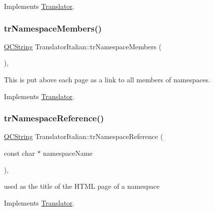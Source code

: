 Implements \mbox{\hyperlink{class_translator}{Translator}}.

\mbox{\label{class_translator_italian_ad97c677662c4d82af62a056c74c02438}} 
\subsubsection{\texorpdfstring{trNamespaceMembers()}{trNamespaceMembers()}}
{\footnotesize\ttfamily \mbox{\hyperlink{class_q_c_string}{Q\+C\+String}} Translator\+Italian\+::tr\+Namespace\+Members (\begin{DoxyParamCaption}{ }\end{DoxyParamCaption})\hspace{0.3cm}{\ttfamily [inline]}, {\ttfamily [virtual]}}

This is put above each page as a link to all members of namespaces. 

Implements \mbox{\hyperlink{class_translator}{Translator}}.

\mbox{\label{class_translator_italian_a5d22c0f0c87bf72f003f810a5e528957}} 
\subsubsection{\texorpdfstring{trNamespaceReference()}{trNamespaceReference()}}
{\footnotesize\ttfamily \mbox{\hyperlink{class_q_c_string}{Q\+C\+String}} Translator\+Italian\+::tr\+Namespace\+Reference (\begin{DoxyParamCaption}\item[{const char $\ast$}]{namespace\+Name }\end{DoxyParamCaption})\hspace{0.3cm}{\ttfamily [inline]}, {\ttfamily [virtual]}}

used as the title of the H\+T\+ML page of a namespace 

Implements \mbox{\hyperlink{class_translator}{Translator}}.

\mbox{\label{class_translator_italian_a91628f1c656997b9c9277b1f98964910}} 
